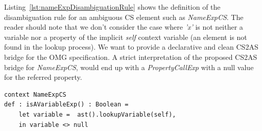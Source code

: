 \documentclass{llncs}
\begin{document}
Listing~\ref{lst:nameExpDisambiguationRule} shows the definition of the disambiguation rule for an ambiguous CS element such as \emph{NameExpCS}. The reader should note that we don't consider the case where \emph{'x'} is not neither a variable nor a property of the implicit \emph{self} context variable (an element is not found in the lookup process). We want to provide a declarative and clean CS2AS bridge for the OMG specification. A strict interpretation of the proposed CS2AS bridge for \emph{NameExpCS}, would end up with a \emph{PropertyCallExp} with a null value for the referred property.

\begin{lstlisting}[caption=NameExpCS disambigutation rule, label=lst:nameExpDisambiguationRule, language=OCL]
context NameExpCS
def : isAVariableExp() : Boolean =
	let variable =  ast().lookupVariable(self),
	in variable <> null
\end{lstlisting}

\end{document}
